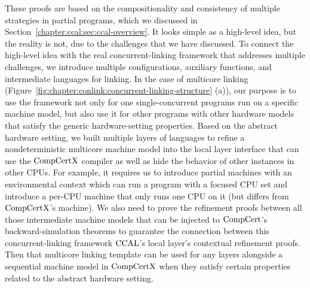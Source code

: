 These proofs are based on the compositionality and  consistency of multiple strategies 
in partial programs, which we discussed in Section~\ref{chapter:ccal:sec:ccal-overview}.
It looks simple as a high-level idea, but the reality is not,
due to the challenges that we have discussed. %
To connect the high-level idea with the real concurrent-linking framework that addresses multiple challenges,
we introduce multiple configurations, auxiliary functions, and intermediate languages for linking. 
In the case of multicore linking (Figure~\ref{fig:chapter:conlink:concurrent-linking-structure} (a)),
our purpose is to use the framework not only for one single-concurrent programs run on a specific machine model, 
but also use it for other programs with other hardware models that satisfy the generic hardware-setting properties. 
Based on the abstract hardware setting, 
we built multiple layers of languages to refine a nondeterministic multicore machine model 
into the local layer interface that can use the $\mathrm{CompCertX}$ compiler as well as 
hide the behavior of other instances in other CPUs.
For example, 
it requires us to introduce partial machines with an environmental context which can run a program with a focused CPU set
and introduce a per-CPU machine that only runs one CPU on it (but differs from $\mathrm{CompCertX}$'s machine). 
We also need to prove the refinement proofs between all those intermediate machine models
that can be injected to $\mathrm{CompCert}$'s backward-simulation theorems to guarantee the connection between this concurrent-linking framework  $\mathrm{CCAL}$'s local layer's contextual refinement proofs. 
Then that multicore linking template can be used for any layers alongside a sequential machine model in $\mathrm{CompCertX}$ when they satisfy certain properties related to the abstract hardware setting. 

